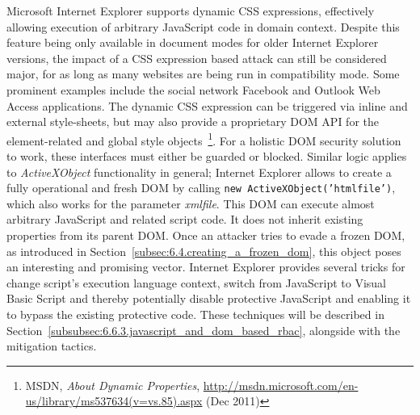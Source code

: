     Microsoft Internet Explorer supports dynamic CSS expressions, effectively allowing execution of arbitrary JavaScript code in domain context. Despite this feature being only available in document modes for older Internet Explorer versions, the impact of a CSS expression based attack can still be considered major, for as long as many websites are being run in compatibility mode. Some prominent examples include the social network Facebook and Outlook Web Access applications. The dynamic CSS expression can be triggered via inline and external style-sheets, but may also provide a proprietary DOM API for the element-related and global style objects~\footnote{MSDN, \textit{About Dynamic Properties}, \url{http://msdn.microsoft.com/en-us/library/ms537634(v=vs.85).aspx} (Dec 2011)}. For a holistic DOM security solution to work, these interfaces must either be guarded or blocked. Similar logic applies to \textit{ActiveXObject} functionality in general; Internet Explorer allows to create a fully operational and fresh DOM by calling \texttt{new ActiveXObject('htmlfile')}, which also works for the parameter \textit{xmlfile}. This DOM can execute almost arbitrary JavaScript and related script code. It does not inherit existing properties from its parent DOM. Once an attacker tries to evade a frozen DOM, as introduced in Section~\ref{subsec:6.4.creating_a_frozen_dom}, this object poses an interesting and promising vector. Internet Explorer provides several tricks for change script's execution language context, switch from JavaScript to Visual Basic Script and thereby potentially disable protective JavaScript and enabling it to bypass the existing protective code. These techniques will be described in Section~\ref{subsubsec:6.6.3.javascript_and_dom_based_rbac}, alongside with the mitigation tactics.\\

